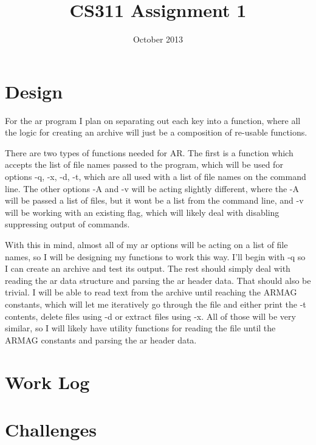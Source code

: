 \documentclass[letterpaper,10pt]{article}
\title{CS311 Assignment 1}
\author{\name}
\date{October 2013}
\begin{document}
\maketitle

\section{Design}

For the ar program I plan on separating out each key into a function, where all
the logic for creating an archive will just be a composition of re-usable
functions.

There are two types of functions needed for AR. The first is a function which
accepts the list of file names passed to the program, which will be used for
options -q, -x, -d, -t, which are all used with a list of file names on the
command line. The other options -A and -v will be acting slightly different,
where the -A will be passed a list of files, but it wont be a list from the
command line, and -v will be working with an existing flag, which will likely
deal with disabling suppressing output of commands.

With this in mind, almost all of my ar options will be acting on a list of file
names, so I will be designing my functions to work this way. I'll begin with -q
so I can create an archive and test its output. The rest should simply deal
with reading the ar data structure and parsing the ar header data. That should
also be trivial. I will be able to read text from the archive until reaching
the ARMAG constants, which will let me iteratively go through the file and
either print the -t contents, delete files using -d or extract files using -x.
All of those will be very similar, so I will likely have utility functions for
reading the file until the ARMAG constants and parsing the ar header data.

\section{Work Log}

\section{Challenges}
\end{document}

